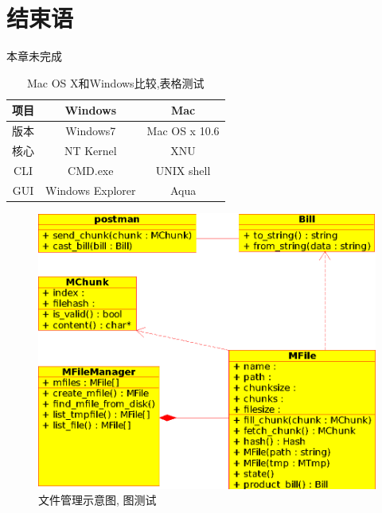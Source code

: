 \chapter*{结束语}
本章未完成

\begin{table}
	\center
	\caption{Mac OS X和Windows比较,表格测试}
	\begin{tabular}[t!]{ccc}
	\hline
	项目 & Windows & Mac \\
	\hline
	版本 & Windows7 & Mac OS x 10.6 \\
	核心 & NT Kernel & XNU \\
	CLI  & CMD.exe & UNIX shell \\
	GUI  &  Windows Explorer & Aqua \\
	\hline
\end{tabular}
\end{table}

\begin{figure}
	\includegraphics{figure/filemanger.eps}
	\caption{文件管理示意图, 图测试}
\end{figure}
